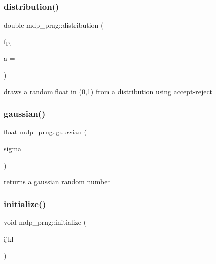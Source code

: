 \subsubsection{\texorpdfstring{distribution()}{distribution()}}
{\footnotesize\ttfamily double mdp\+\_\+prng\+::distribution (\begin{DoxyParamCaption}\item[{float($\ast$)(float, void $\ast$)}]{fp,  }\item[{void $\ast$}]{a = {} }\end{DoxyParamCaption})\hspace{0.3cm}{\ttfamily [inline]}}



draws a random float in (0,1) from a distribution using accept-\/reject 

\mbox{\label{classmdp__prng_adf372628df14ef01302472264a7f26d8}} 
\subsubsection{\texorpdfstring{gaussian()}{gaussian()}}
{\footnotesize\ttfamily float mdp\+\_\+prng\+::gaussian (\begin{DoxyParamCaption}\item[{float}]{sigma = {} }\end{DoxyParamCaption})\hspace{0.3cm}{\ttfamily [inline]}}



returns a gaussian random number 

\mbox{\label{classmdp__prng_a2a41d455e32ec21fce0c76f71bda801a}} 
\subsubsection{\texorpdfstring{initialize()}{initialize()}}
{\footnotesize\ttfamily void mdp\+\_\+prng\+::initialize (\begin{DoxyParamCaption}\item[{\hyperlink{mdp__global__vars_8h_aaa1ad9d0dcd2124aa5af0120d9954174}{mdp\+\_\+int}}]{ijkl }\end{DoxyParamCaption})\hspace{0.3cm}{\ttfamily [inline]}}

